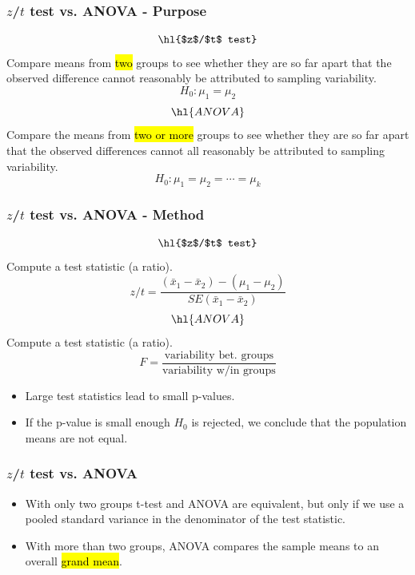 
\begin{frame}
\frametitle{$z$/$t$ test vs. ANOVA - Purpose}

{
\[ \hl{$z$/$t$ test} \]
Compare means from \hl{two} groups to see whether they are so far apart that the observed difference cannot reasonably be attributed to sampling variability.
\[ H_0: \mu_1 = \mu_2 \]
}
{
\[ \hl{ANOVA} \]
Compare the means from \hl{two or more} groups to see whether they are so far apart that the observed differences cannot all reasonably be attributed to sampling variability.
\[ H_0: \mu_1 = \mu_2 = \cdots = \mu_k \]
}

\end{frame}


\begin{frame}
\frametitle{$z$/$t$ test vs. ANOVA - Method}

{
\[ \hl{$z$/$t$ test} \]
Compute a test statistic (a ratio).
\[ z / t = \frac{(\bar{x}_1 - \bar{x}_2) - (\mu_1 - \mu_2)}{SE(\bar{x}_1 - \bar{x}_2)} \]
}
{
\[ \hl{ANOVA} \]
Compute a test statistic (a ratio).
\[ F = \frac{\text{variability bet. groups}}{\text{variability w/in groups}} \]
}

\vspace{1cm}

\pause

\begin{itemize}

\item Large test statistics lead to small p-values. 

\item If the p-value is small enough $H_0$ is rejected, we conclude that the population means are not equal.

\end{itemize}

\end{frame}


\begin{frame}
\frametitle{$z$/$t$ test vs. ANOVA}

\begin{itemize}

\item With only two groups t-test and ANOVA are equivalent, but only if we use a pooled standard variance in the denominator of the test statistic.

\pause

\item With more than two groups, ANOVA compares the sample means to an overall \hl{grand mean}.

\end{itemize}

\end{frame}

